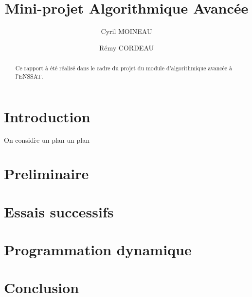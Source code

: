 \documentclass[11pt]{article}
\title{Mini-projet Algorithmique Avanc\'ee}
\author{Cyril MOINEAU \and R\'emy CORDEAU}
\date{}
\begin{document}
\maketitle

\begin{abstract}
Ce rapport \`a \'et\'e r\'ealis\'e dans le cadre du projet du module d'algorithmique avanc\'ee \`a l'ENSSAT.
\end{abstract}

\section{Introduction}\label{section-introduction}

On consid\`re un plan un plan


\section{Preliminaire}\label{section-preliminaire}

\section{Essais successifs}\label{section-ES}

\section{Programmation dynamique}\label{section-PD}

\section{Conclusion}\label{section-conclusion}
\end{document}
